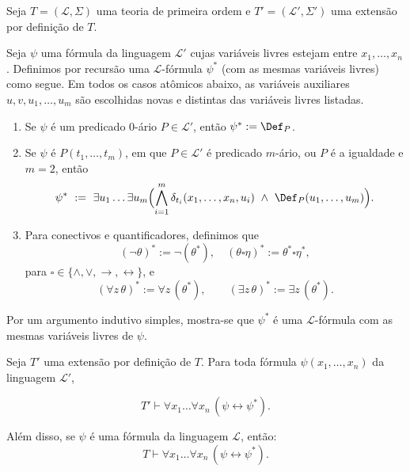 \begin{metadefinition}\label{mdef:traducaoFormulas}
    Seja $T=(\mathcal L, \Sigma)$ uma teoria de primeira ordem e $T'=(\mathcal L', \Sigma')$ uma extensão por definição de $T$.

    Seja $\psi$ uma fórmula da linguagem $\mathcal L'$ cujas variáveis livres estejam entre $x_1,\ldots,x_n$.
    Definimos por recursão uma $\mathcal L$-fórmula $\psi^\ast$ (com as mesmas variáveis livres) como segue.
    Em todos os casos atômicos abaixo, as variáveis auxiliares $u,v,u_1,\ldots,u_m$ são escolhidas novas e distintas das variáveis livres listadas.

    \begin{enumerate}[label=(\roman*)]
        \item Se $\psi$ é um predicado $0$-ário $P\in\mathcal L'$, então $\psi^\ast:=\Def_P$.

        \item Se $\psi$ é $P(t_1,\ldots,t_m)$, em que $P\in\mathcal L'$ é predicado $m$-ário, ou $P$ é a igualdade e $m=2$, então
        \[
            \psi^\ast\ :=\ \exists u_1\ldots \exists u_m\Bigl(\bigwedge_{i=1}^m \delta_{t_i}(x_1,\ldots,x_n,u_i)\ \wedge\ \Def_P(u_1,\ldots,u_m)\Bigr).
        \]

        \item Para conectivos e quantificadores, definimos que
        \[
            (\neg\theta)^\ast:=\neg(\theta^\ast),\quad
            (\theta\square\eta)^\ast:=\theta^\ast\square\eta^\ast,
        \]
        para $\square\in\{\wedge,\vee,\rightarrow,\leftrightarrow\}$, e
        \[
            (\forall z\,\theta)^\ast:=\forall z\,(\theta^\ast),\qquad
            (\exists z\,\theta)^\ast:=\exists z\,(\theta^\ast).
        \]
    \end{enumerate}
\end{metadefinition}

Por um argumento indutivo simples, mostra-se que $\psi^\ast$ é uma $\mathcal L$-fórmula com as mesmas variáveis livres de $\psi$.

\begin{metalemma}\label{mlem:eliminacaoDeFormulas}
    Seja $T'$ uma extensão por definição de $T$.
    Para toda fórmula $\psi(x_1, \dots, x_n)$ da linguagem $\mathcal L'$,
    
    \[
        T'\vdash \forall x_1\ldots \forall x_n\,(\psi\leftrightarrow \psi^\ast).
    \]

    Além disso, se $\psi$ é uma fórmula da linguagem $\mathcal L$, então:
    \[
        T\vdash \forall x_1\ldots \forall x_n\,(\psi\leftrightarrow \psi^\ast).
    \]
\end{metalemma}

